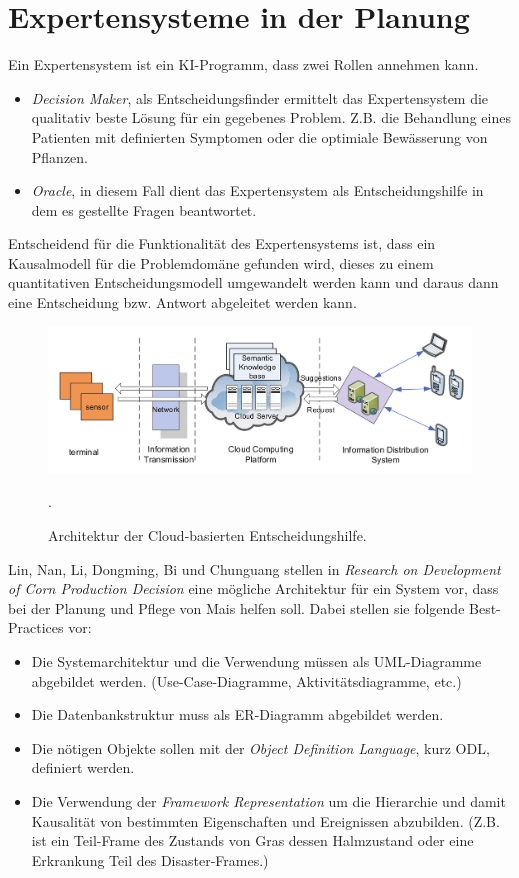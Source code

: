 \section{Expertensysteme in der Planung}
Ein Expertensystem ist ein KI-Programm, dass zwei Rollen annehmen kann.
\begin{itemize}
	\item \textit{Decision Maker}, als Entscheidungsfinder ermittelt das Expertensystem die qualitativ beste Lösung für ein gegebenes Problem. Z.B. die Behandlung eines Patienten mit definierten Symptomen oder die optimiale Bewässerung von Pflanzen.
	\item \textit{Oracle}, in diesem Fall dient das Expertensystem als Entscheidungshilfe in dem es gestellte Fragen beantwortet. 
\end{itemize}
Entscheidend für die Funktionalität des Expertensystems ist, dass ein Kausalmodell für die Problemdomäne gefunden wird, dieses zu einem quantitativen Entscheidungsmodell umgewandelt werden kann und daraus dann eine Entscheidung bzw. Antwort abgeleitet werden kann.\cite{book:Russell1995}

\begin{figure}[h]
 \includegraphics[scale=0.35,natwidth=\textwidth]{figures/designtools/cloud_iot_decisionmaker.png}
 \centering
 \label{fig:fmishierarchy}
 \caption{Architektur der Cloud-basierten Entscheidungshilfe.\cite{jour:Yuan2013}}.
\end{figure}


Lin, Nan, Li, Dongming, Bi und Chunguang stellen in \textit{Research on Development of Corn Production Decision} eine mögliche Architektur für ein System vor, dass bei der Planung und Pflege von Mais helfen soll. Dabei stellen sie folgende Best-Practices vor: 
\cite{jour:Lin2013}

\begin{itemize}
	\item Die Systemarchitektur und die Verwendung müssen als UML-Diagramme abgebildet werden. (Use-Case-Diagramme, Aktivitätsdiagramme, etc.)
	\item Die Datenbankstruktur muss als ER-Diagramm abgebildet werden.
	\item Die nötigen Objekte sollen mit der \textit{Object Definition Language}, kurz ODL, definiert werden.
	\item Die Verwendung der \textit{Framework Representation} um die Hierarchie und damit Kausalität von bestimmten Eigenschaften und Ereignissen abzubilden. (Z.B. ist ein Teil-Frame des Zustands von Gras dessen Halmzustand oder eine Erkrankung Teil des Disaster-Frames.)
\end{itemize}

